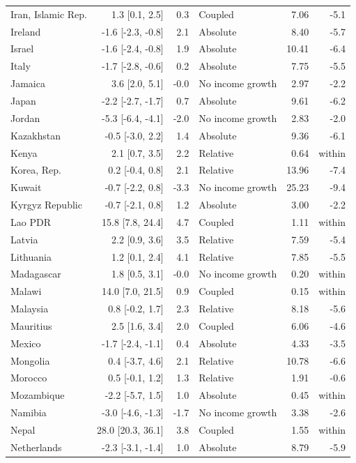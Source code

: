 \begin{longtable}{@{}lrrlrr@{}}
Iran, Islamic Rep. & 1.3 [0.1, 2.5] & 0.3 & Coupled & 7.06 & -5.1 \\
Ireland & -1.6 [-2.3, -0.8] & 2.1 & Absolute & 8.40 & -5.7 \\
Israel & -1.6 [-2.4, -0.8] & 1.9 & Absolute & 10.41 & -6.4 \\
Italy & -1.7 [-2.8, -0.6] & 0.2 & Absolute & 7.75 & -5.5 \\
Jamaica & 3.6 [2.0, 5.1] & -0.0 & No income growth & 2.97 & -2.2 \\
Japan & -2.2 [-2.7, -1.7] & 0.7 & Absolute & 9.61 & -6.2 \\
Jordan & -5.3 [-6.4, -4.1] & -2.0 & No income growth & 2.83 & -2.0 \\
Kazakhstan & -0.5 [-3.0, 2.2] & 1.4 & Absolute & 9.36 & -6.1 \\
Kenya & 2.1 [0.7, 3.5] & 2.2 & Relative & 0.64 & within \\
Korea, Rep. & 0.2 [-0.4, 0.8] & 2.1 & Relative & 13.96 & -7.4 \\
Kuwait & -0.7 [-2.2, 0.8] & -3.3 & No income growth & 25.23 & -9.4 \\
Kyrgyz Republic & -0.7 [-2.1, 0.8] & 1.2 & Absolute & 3.00 & -2.2 \\
Lao PDR & 15.8 [7.8, 24.4] & 4.7 & Coupled & 1.11 & within \\
Latvia & 2.2 [0.9, 3.6] & 3.5 & Relative & 7.59 & -5.4 \\
Lithuania & 1.2 [0.1, 2.4] & 4.1 & Relative & 7.85 & -5.5 \\
Madagascar & 1.8 [0.5, 3.1] & -0.0 & No income growth & 0.20 & within \\
Malawi & 14.0 [7.0, 21.5] & 0.9 & Coupled & 0.15 & within \\
Malaysia & 0.8 [-0.2, 1.7] & 2.3 & Relative & 8.18 & -5.6 \\
Mauritius & 2.5 [1.6, 3.4] & 2.0 & Coupled & 6.06 & -4.6 \\
Mexico & -1.7 [-2.4, -1.1] & 0.4 & Absolute & 4.33 & -3.5 \\
Mongolia & 0.4 [-3.7, 4.6] & 2.1 & Relative & 10.78 & -6.6 \\
Morocco & 0.5 [-0.1, 1.2] & 1.3 & Relative & 1.91 & -0.6 \\
Mozambique & -2.2 [-5.7, 1.5] & 1.0 & Absolute & 0.45 & within \\
Namibia & -3.0 [-4.6, -1.3] & -1.7 & No income growth & 3.38 & -2.6 \\
Nepal & 28.0 [20.3, 36.1] & 3.8 & Coupled & 1.55 & within \\
Netherlands & -2.3 [-3.1, -1.4] & 1.0 & Absolute & 8.79 & -5.9 \\

\end{longtable}
